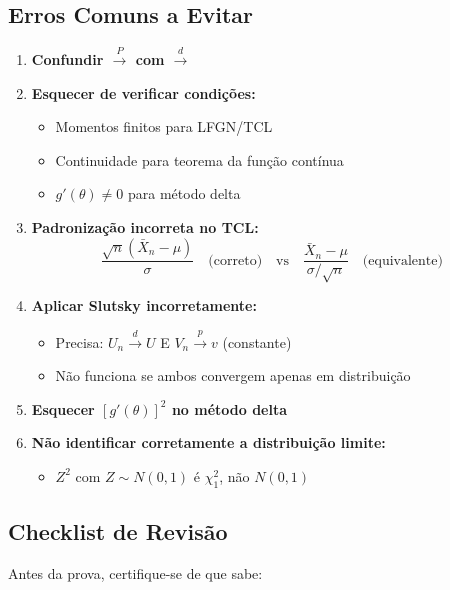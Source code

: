 \documentclass[12pt,a4paper]{article}
\theoremstyle{definition}
\theoremstyle{remark}
\begin{document}
\subsection{Erros Comuns a Evitar}

\begin{enumerate}
    \item \textbf{Confundir $\xrightarrow{P}$ com $\xrightarrow{d}$}
    
    \item \textbf{Esquecer de verificar condições:}
    \begin{itemize}
        \item Momentos finitos para LFGN/TCL
        \item Continuidade para teorema da função contínua
        \item $g'(\theta) \neq 0$ para método delta
    \end{itemize}
    
    \item \textbf{Padronização incorreta no TCL:}
    \[
    \frac{\sqrt{n}(\bar{X}_n - \mu)}{\sigma} \quad \text{(correto)} \quad \text{vs} \quad \frac{\bar{X}_n - \mu}{\sigma/\sqrt{n}} \quad \text{(equivalente)}
    \]
    
    \item \textbf{Aplicar Slutsky incorretamente:}
    \begin{itemize}
        \item Precisa: $U_n \xrightarrow{d} U$ E $V_n \xrightarrow{p} v$ (constante)
        \item Não funciona se ambos convergem apenas em distribuição
    \end{itemize}
    
    \item \textbf{Esquecer $[g'(\theta)]^2$ no método delta}
    
    \item \textbf{Não identificar corretamente a distribuição limite:}
    \begin{itemize}
        \item $Z^2$ com $Z \sim N(0,1)$ é $\chi^2_1$, não $N(0,1)$
    \end{itemize}
\end{enumerate}

\subsection{Checklist de Revisão}

Antes da prova, certifique-se de que sabe:
\end{document}
